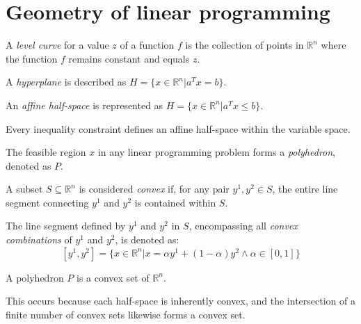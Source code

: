 \section{Geometry of linear programming}

\begin{definition}
    A \emph{level curve} for a value $z$ of a function $f$ is the collection of points in $\mathbb{R}^n$  where the function $f$ remains constant and equals $z$.

    A \emph{hyperplane} is described as $H=\{x \in \mathbb{R}^n|a^Tx=b\}$. 

    An \emph{affine half-space} is represented as $H=\{x \in \mathbb{R}^n|a^Tx \leq b\}$. 
\end{definition}
Every inequality constraint defines an affine half-space within the variable space.
\begin{definition}
    The feasible region $x$  in any linear programming problem forms a \emph{polyhedron}, denoted as $P$. 

    A subset $S \subseteq \mathbb{R}^n$ is considered \emph{convex} if, for any pair $y^1,y^2 \in S$, the entire line segment connecting $y^1$ and $y^2$ is contained within $S$. 

    The line segment defined by $y^1$ and $y^2 $ in $ S$, encompassing all \emph{convex combinations} of $y^1$ and $y^2$, is denoted as:
    \[[y^1,y^2]=\{x \in \mathbb{R}^n|x=\alpha y^1+(1-\alpha)y^2 \land \alpha \in [0,1]\} \]
\end{definition}
\begin{property}
    A polyhedron $P$ is a convex set of $\mathbb{R}^n$. 
\end{property}
This occurs because each half-space is inherently convex, and the intersection of a finite number of convex sets likewise forms a convex set.

